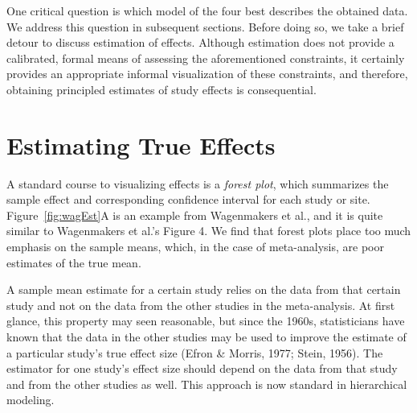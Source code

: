\documentclass[english,man]{apa6}
\theoremstyle{definition}
\theoremstyle{definition}
\theoremstyle{remark}
\begin{document}
One critical question is which model of the four best describes the
obtained data. We address this question in subsequent sections. Before
doing so, we take a brief detour to discuss estimation of effects.
Although estimation does not provide a calibrated, formal means of
assessing the aforementioned constraints, it certainly provides an
appropriate informal visualization of these constraints, and therefore,
obtaining principled estimates of study effects is consequential.

\section{Estimating True Effects}\label{estimating-true-effects}

A standard course to visualizing effects is a \emph{forest plot}, which
summarizes the sample effect and corresponding confidence interval for
each study or site. Figure~\ref{fig:wagEst}A is an example from
Wagenmakers et al., and it is quite similar to Wagenmakers et al.'s
Figure 4. We find that forest plots place too much emphasis on the
sample means, which, in the case of meta-analysis, are poor estimates of
the true mean.

A sample mean estimate for a certain study relies on the data from that
certain study and not on the data from the other studies in the
meta-analysis. At first glance, this property may seen reasonable, but
since the 1960s, statisticians have known that the data in the other
studies may be used to improve the estimate of a particular study's true
effect size (Efron \& Morris, 1977; Stein, 1956). The estimator for one
study's effect size should depend on the data from that study and from
the other studies as well. This approach is now standard in hierarchical
modeling.
\end{document}

